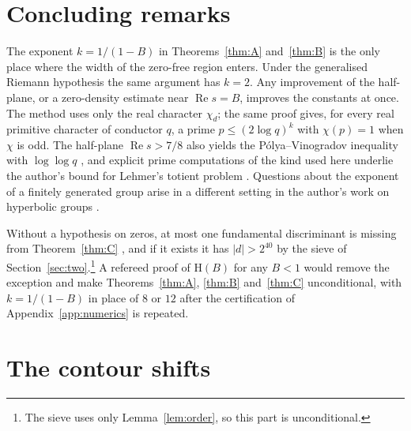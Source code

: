 \documentclass[11pt]{amsart}
\theoremstyle{definition}
\theoremstyle{remark}
\numberwithin{equation}{section}
\renewcommand{\Re}{\operatorname{Re}}
\newcommand{\Hyp}{\mathrm{H}}
\begin{document}
\section{Concluding remarks}\label{sec:remarks}

The exponent $k=1/(1-B)$ in Theorems~\ref{thm:A} and~\ref{thm:B} is the only place where the width of the zero-free region enters. Under the generalised Riemann hypothesis the same argument has $k=2$. Any improvement of the half-plane, or a zero-density estimate near $\Re s=B$, improves the constants at once. The method uses only the real character $\chi_d$; the same proof gives, for every real primitive character of conductor $q$, a prime $p\le(2\log q)^{k}$ with $\chi(p)=1$ when $\chi$ is odd. The half-plane $\Re s>7/8$ also yields the P\'olya--Vinogradov inequality with $\log\log q$ \cite{BhaPV}, and explicit prime computations of the kind used here underlie the author's bound for Lehmer's totient problem \cite{BhaLehmer}. Questions about the exponent of a finitely generated group arise in a different setting in the author's work on hyperbolic groups \cite{Bha22}.

Without a hypothesis on zeros, at most one fundamental discriminant is missing from Theorem~\ref{thm:C} \cite{Wei73}, and if it exists it has $|d|>2^{40}$ by the sieve of Section~\ref{sec:two}.\footnote{The sieve uses only Lemma~\ref{lem:order}, so this part is unconditional.} A refereed proof of $\Hyp(B)$ for any $B<1$ would remove the exception and make Theorems~\ref{thm:A}, \ref{thm:B} and~\ref{thm:C} unconditional, with $k=1/(1-B)$ in place of $8$ or $12$ after the certification of Appendix~\ref{app:numerics} is repeated.

\appendix

\section{The contour shifts}\label{app:contour}
\end{document}
